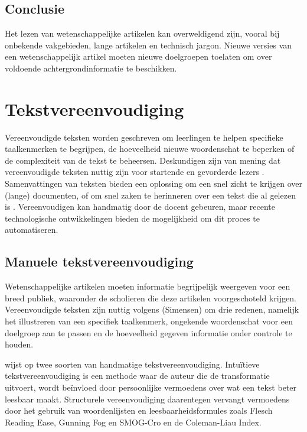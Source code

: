 \subsection{Conclusie}

Het lezen van wetenschappelijke artikelen kan overweldigend zijn, vooral bij onbekende vakgebieden, lange artikelen en technisch jargon. Nieuwe versies van een wetenschappelijk artikel moeten nieuwe doelgroepen toelaten om over voldoende achtergrondinformatie te beschikken.

\section{Tekstvereenvoudiging}

Vereenvoudigde teksten worden geschreven om leerlingen te helpen specifieke taalkenmerken te begrijpen, de hoeveelheid nieuwe woordenschat te beperken of de complexiteit van de tekst te beheersen. Deskundigen zijn van mening dat vereenvoudigde teksten nuttig zijn voor startende en gevorderde lezers \autocite{Louwerse2007}. Samenvattingen van teksten bieden een oplossing om een snel zicht te krijgen over (lange) documenten, of om snel zaken te herinneren over een tekst die al gelezen is \autocite{McCombes2020}. Vereenvoudigen kan handmatig door de docent gebeuren, maar recente technologische ontwikkelingen bieden de mogelijkheid om dit proces te automatiseren.

\subsection{Manuele tekstvereenvoudiging}

Wetenschappelijke artikelen moeten informatie begrijpelijk weergeven voor een breed publiek, waaronder de scholieren die deze artikelen voorgeschoteld krijgen. Vereenvoudigde teksten zijn nuttig volgens (Simensen) om drie redenen, namelijk het illustreren van een specifiek taalkenmerk, ongekende woordenschat voor een doelgroep aan te passen en de hoeveelheid gegeven informatie onder controle te houden. 

\textcite{Crossley2012} wijst op twee soorten van handmatige tekstvereenvoudiging. Intuïtieve tekstvereenvoudiging is een methode waar de auteur die de transformatie uitvoert, wordt beïnvloed door persoonlijke vermoedens over wat een tekst beter leesbaar maakt. Structurele vereenvoudiging daarentegen vervangt vermoedens door het gebruik van woordenlijsten en leesbaarheidsformules zoals Flesch Reading Ease, Gunning Fog en SMOG-Cro en de Coleman-Liau Index.

